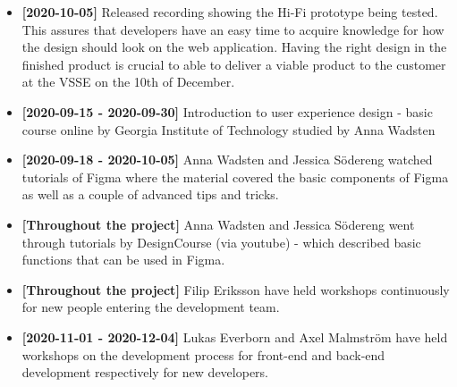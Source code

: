     \begin{itemize}

    \item \textbf{[2020-10-05]} Released recording showing the Hi-Fi prototype being tested. This assures that developers have an easy time to acquire knowledge for how the design should look on the web application. Having the right design in the finished product is crucial to able to deliver a viable product to the customer at the VSSE on the 10th of December.
    
   \item \textbf{[2020-09-15 - 2020-09-30]} Introduction to user experience design - basic course online by Georgia Institute of Technology studied by Anna Wadsten
	\item \textbf{[2020-09-18 - 2020-10-05]} Anna Wadsten and Jessica Södereng watched tutorials of Figma where the material covered the basic components of Figma as well as a couple of advanced tips and tricks. 
\item \textbf{[Throughout the project]} Anna Wadsten and Jessica Södereng went through tutorials by DesignCourse (via youtube) - which described basic functions that can be used in Figma.
    \item \textbf{[Throughout the project]} Filip Eriksson have held workshops continuously for new people entering the development team.
    \item \textbf{[2020-11-01 - 2020-12-04]} Lukas Everborn and Axel Malmström have held workshops on the development process for front-end and back-end development respectively for new developers. 
 
\end{itemize}


